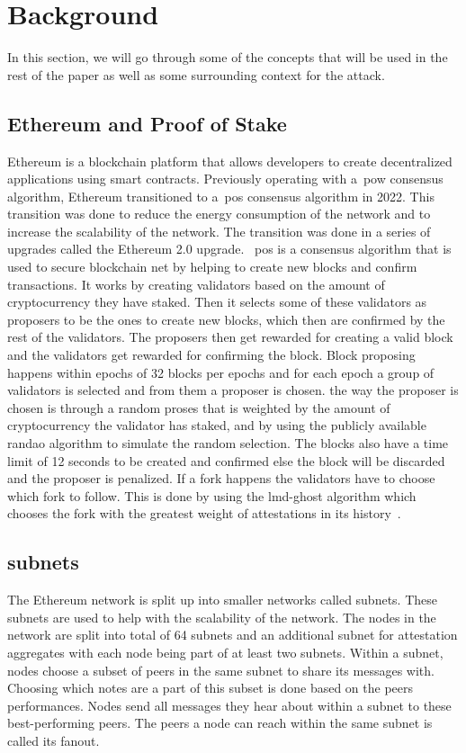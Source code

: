 
\section{Background}\label{sec:background}
In this section, we will go through some of the concepts that will be used in the rest of the paper as well as some surrounding context for the attack.

\subsection{Ethereum and Proof of Stake}\label{subsec:ethereum-and-proof-of-stake}
Ethereum is a blockchain platform that allows developers to create decentralized applications using smart contracts.
Previously operating with a~\gls{pow} consensus algorithm, Ethereum transitioned to a~\gls{pos} consensus algorithm in 2022.
This transition was done to reduce the energy consumption of the network and to increase the scalability of the network.
The transition was done in a series of upgrades called the Ethereum 2.0 upgrade.
~\gls{pos} is a consensus algorithm that is used to secure blockchain net by helping to create new blocks and confirm transactions.
It works by creating validators based on the amount of cryptocurrency they have staked.
Then it selects some of these validators as proposers to be the ones to create new blocks, which then are confirmed by the rest of the validators.
The proposers then get rewarded for creating a valid block and the validators get rewarded for confirming the block.
Block proposing happens within epochs of 32 blocks per epochs and for each epoch a group of validators is selected and from them a proposer is chosen.
the way the proposer is chosen is through a random proses that is weighted by the amount of cryptocurrency the validator has staked, and by using the publicly available \gls{randao} algorithm to simulate the random selection.
The blocks also have a time limit of 12 seconds to be created and confirmed else the block will be discarded and the proposer is penalized.
If a fork happens the validators have to choose which fork to follow.
This is done by using the \gls{lmd-ghost} algorithm which chooses the fork with the greatest weight of attestations in its history~\cite{EthereumProof-of-stakePoS}.

\subsection{subnets}\label{subsec:subnets}
The Ethereum network is split up into smaller networks called subnets.
These subnets are used to help with the scalability of the network.
The nodes in the network are split into total of 64 subnets and an additional subnet for attestation aggregates with each node being part of at least two subnets.
Within a subnet, nodes choose a subset of peers in the same subnet to share its messages with.
Choosing which notes are a part of this subset is done based on the peers performances.
Nodes send all messages they hear about within a subnet to these best-performing peers.
The peers a node can reach within the same subnet is called its fanout.



